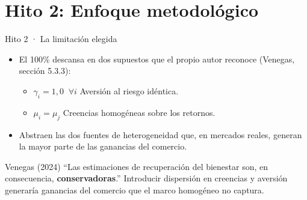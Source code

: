 \documentclass[xcolor=dvipsnames]{beamer}
\begin{document}
\section{Hito 2: Enfoque metodológico}
\begin{frame}{Hito 2 · La limitación elegida}
\begin{itemize}
  \item El 100\% descansa en dos supuestos que el propio autor reconoce
        (Venegas, sección 5.3.3):
  \begin{itemize}
    \item $\gamma_i = 1{,}0 \;\; \forall i$   Aversión al riesgo idéntica.
    \item $\mu_i = \mu_j$  Creencias homogéneas sobre los retornos.
  \end{itemize}
  \item Abstraen las dos fuentes de heterogeneidad que, en mercados reales,
        generan la mayor parte de las ganancias del comercio.
\end{itemize}
\vfill
\begin{block}{Venegas (2024)}
  ``Las estimaciones de recuperación del bienestar son, en consecuencia,
  \textbf{conservadoras}.'' Introducir dispersión en creencias y aversión
  generaría ganancias del comercio que el marco homogéneo no captura.
\end{block}
\end{frame}
\end{document}
